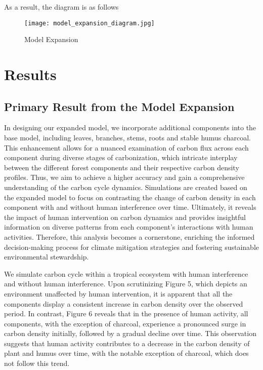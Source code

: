\documentclass[a4paper]{article}
\begin{document}
As a result, the diagram is as follows

\begin{figure}[!htb]
    \centering
    \texttt{[image: model\_expansion\_diagram.jpg]}
    \caption{Model Expansion}
\end{figure}

\section{Results}
\subsection{Primary Result from the Model Expansion} 

In designing our expanded model, we incorporate additional components into the base model, including leaves, branches, stems, roots and stable humus charcoal. This enhancement allows for a nuanced examination of carbon flux across each component during diverse stages of carbonization, which intricate interplay between the different forest components and their respective carbon density profiles. Thus, we aim to achieve a higher accuracy and gain a comprehensive understanding of the carbon cycle dynamics. Simulations are created based on the expanded model to focus on contrasting the change of carbon density in each component with and without human interference over time. Ultimately, it reveals the impact of human intervention on carbon dynamics and provides insightful information on diverse patterns from each component's interactions with human activities. Therefore, this analysis becomes a cornerstone, enriching the informed decision-making process for climate mitigation strategies and fostering sustainable environmental stewardship. 

We simulate carbon cycle within a tropical ecosystem with human interference and without human interference. Upon scrutinizing Figure 5, which depicts an environment unaffected by human intervention, it is apparent that all the components display a consistent increase in carbon density over the observed period. In contrast, Figure 6 reveals that in the presence of human activity, all components, with the exception of charcoal, experience a pronounced surge in carbon density initially, followed by a gradual decline over time. This observation suggests that human activity contributes to a decrease in the carbon density of plant and humus over time, with the notable exception of charcoal, which does not follow this trend.
\end{document}
